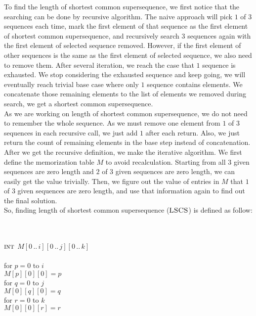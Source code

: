 \documentclass[11pt]{article}
\begin{document}
\begin{solution}

	To find the length of shortest common supersequence, we first notice that the searching can be done by recursive algorithm. The naive approach will pick $1$ of $3$ sequences each time, mark the first element of that sequence as the first element of shortest common supersequence, and recursively search $3$ sequences again with the first element of selected sequence removed. However, if the first element of other sequences is the same as the first element of selected sequence, we also need to remove them. After several iteration, we reach the case that $1$ sequence is exhausted. We stop considering the exhausted sequence and keep going, we will eventually reach trivial base case where only $1$ sequence contains elements. We concatenate those remaining elements to the list of elements we removed during search, we get a shortest common supersequence.\\
	As we are working on length of shortest common supersequence, we do not need to remember the whole sequence. As we must remove one element from $1$ of $3$ sequences in each recursive call, we just add $1$ after each return. Also, we just return the count of remaining elements in the base step instead of concatenation.\\
	After we get the recursive definition, we make the iterative algorithm. We first define the memorization table $M$ to avoid recalculation. Starting from all $3$ given sequences are zero length and $2$ of $3$ given sequences are zero length, we can easily get the value trivially. Then, we figure out the value of entries in $M$ that $1$ of $3$ given sequences are zero length, and use that information again to find out the final solution.\\
	
	So, finding length of shortest common supersequence ($\textsc{LSCS}$) is defined as follow:
\begin{algo}
	\+
\\[0.5ex]
\\		$\textsc{int}$ $M[0\,..\,i][0\,..\,j][0\,..\,k]$
\\		
\\		for $p = 0$ to $i$\+
\\			$M[p][0][0] = p$\-
\\		for $q = 0$ to $j$\+
\\			$M[0][q][0] = q$\-
\\		for $r = 0$ to $k$\+
\\			$M[0][0][r] = r$\-


\end{algo}
\end{solution}
\end{document}
